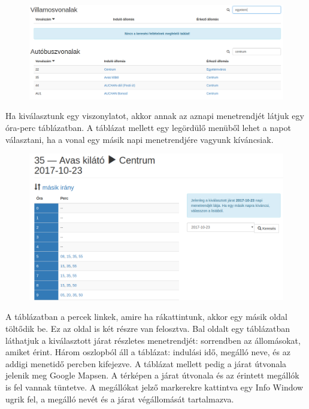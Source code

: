 \begin{figure}[htb]
\centering
\includegraphics[scale=0.32]{kepek/vonalak_tablazat.png}
\caption{}
\label{fig:vonalak_tablazat}
\end{figure}

Ha kiválasztunk egy viszonylatot, akkor annak az aznapi menetrendjét látjuk egy óra-perc táblázatban. A táblázat mellett egy legördülő menüből lehet a napot választani, ha a vonal egy másik napi menetrendjére vagyunk kíváncsiak.

\begin{figure}[htb]
\centering
\includegraphics[scale=0.4]{kepek/menetrend.png}
\caption{}
\label{fig:menetrend}
\end{figure}

A táblázatban a percek linkek, amire ha rákattintunk, akkor egy másik oldal töltődik be. Ez az oldal is két részre van felosztva. Bal oldalt egy táblázatban láthatjuk a kiválasztott járat részletes menetrendjét: sorrendben az állomásokat, amiket érint. Három oszlopból áll a táblázat: indulási idő, megálló neve, és az addigi menetidő percben kifejezve. A táblázat mellett pedig a járat útvonala jelenik meg Google Mapsen. A térképen a járat útvonala és az érintett megállók is fel vannak tüntetve. A megállókat jelző markerekre kattintva egy Info Window ugrik fel, a megálló nevét és a járat végállomását tartalmazva.

